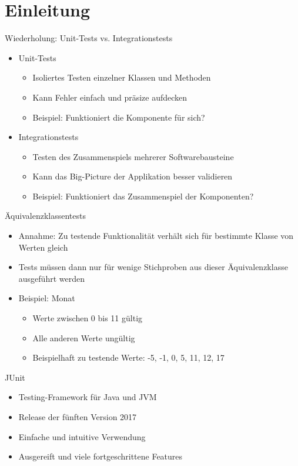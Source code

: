 \documentclass[utf8,t,aspectratio=169]{beamer}
\begin{document}
  \section{Einleitung}
    \begin{frame}[fragile]{Wiederholung: Unit-Tests vs. Integrationstests}
      \begin{itemize}
        \item Unit-Tests
          \begin{itemize}
            \item Isoliertes Testen einzelner Klassen und Methoden
            \item Kann Fehler einfach und präsize aufdecken
            \item Beispiel: \glqq{}Funktioniert die Komponente für sich?\grqq
          \end{itemize}
        \item Integrationstests
          \begin{itemize}
            \item Testen des Zusammenspiels mehrerer Softwarebausteine
            \item Kann das Big-Picture der Applikation besser validieren
            \item Beispiel: \glqq{}Funktioniert das Zusammenspiel der Komponenten?\grqq
          \end{itemize}
      \end{itemize}
    \end{frame}
    \begin{frame}[fragile]{Äquivalenzklassentests}
      \begin{itemize}
        \item Annahme: Zu testende Funktionalität verhält sich für bestimmte Klasse von Werten gleich
        \item Tests müssen dann nur für wenige Stichproben aus dieser Äquivalenzklasse ausgeführt werden
        \item Beispiel: Monat
          \begin{itemize}
            \item Werte zwischen 0 bis 11 gültig
            \item Alle anderen Werte ungültig
            \item Beispielhaft zu testende Werte: -5, -1, 0, 5, 11, 12, 17
          \end{itemize}
      \end{itemize}
    \end{frame}
    \begin{frame}{JUnit}
      \begin{itemize}
        \item Testing-Framework für Java und JVM
        \item Release der fünften Version 2017
        \item Einfache und intuitive Verwendung
        \item Ausgereift und viele fortgeschrittene Features
      \end{itemize}
    \end{frame}
\end{document}
